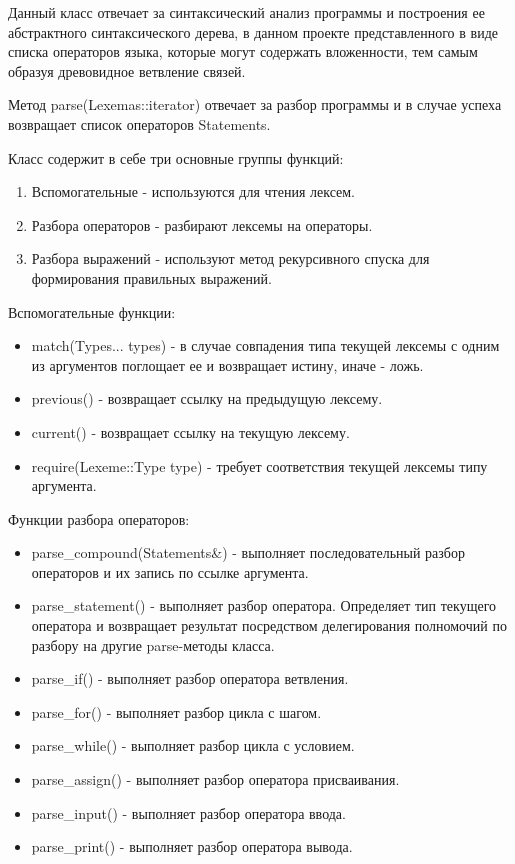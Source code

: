 Данный класс отвечает за синтаксический анализ программы
и построения ее абстрактного синтаксического дерева,
в данном проекте представленного в виде списка
операторов языка, которые могут содержать
вложенности, тем самым образуя древовидное ветвление связей.

Метод parse(Lexemas::iterator) отвечает за разбор программы
и в случае успеха возвращает список операторов Statements.

Класс содержит в себе три основные группы функций:
\begin{enumerate}
    \item Вспомогательные - используются для чтения лексем.
    \item Разбора операторов - разбирают лексемы на операторы.
    \item Разбора выражений - используют метод рекурсивного
          спуска для формирования правильных выражений.
\end{enumerate}

Вспомогательные функции:
\begin{itemize}
    \item match(Types... types) - в случае совпадения
          типа текущей лексемы с одним из аргументов
          поглощает ее и возвращает истину, иначе - ложь.

    \item previous() - возвращает ссылку на предыдущую лексему.
    
    \item current() - возвращает ссылку на текущую лексему.
    
    \item require(Lexeme::Type type) - требует соответствия
          текущей лексемы типу аргумента.
\end{itemize}

Функции разбора операторов:
\begin{itemize}
    \item parse\_compound(Statements\&) - 
          выполняет последовательный разбор 
          операторов и их запись по ссылке аргумента.

    \item parse\_statement() - выполняет разбор оператора.
          Определяет тип текущего оператора и возвращает
          результат посредством делегирования полномочий
          по разбору на другие parse-методы класса.

    \item parse\_if() - выполняет разбор оператора ветвления.
    \item parse\_for() - выполняет разбор цикла с шагом.
    \item parse\_while() - выполняет разбор цикла с условием.
    \item parse\_assign() - выполняет разбор оператора присваивания.
    \item parse\_input() - выполняет разбор оператора ввода.
    \item parse\_print() - выполняет разбор оператора вывода.
\end{itemize}

